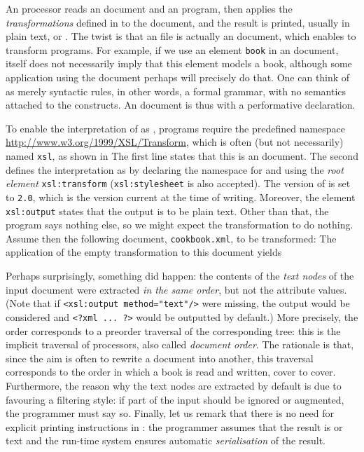 An \XSLT processor reads an \XML document and an \XSLT program, then
applies the \emph{transformations} defined in \XSLT to the document,
and the result is printed, usually in plain text, \XML or \HTML. The
twist is that an \XSLT file is actually an \XML document, which
enables \XSLT to transform \XSLT programs. For example, if we use an
element \verb|book| in an \XML document, \XML itself does not
necessarily imply that this element models a book, although some
application using the document perhaps will precisely do that. One can
think of \XML as merely syntactic rules, in other words, a formal
grammar, with no semantics attached to the constructs. An \XSLT
document is thus \XML with a performative declaration.

To enable the interpretation of \XML as \XSLT, \XSLT programs require
the predefined namespace \url{http://www.w3.org/1999/XSL/Transform},
which is often (but not necessarily) named \texttt{xsl}, as shown in
 The first line states that this is an \XML
document. The second defines the interpretation as \XSLT by declaring
the namespace for \XSLT and using the \emph{root element}
\texttt{xsl:transform} (\texttt{xsl:stylesheet} is also accepted). The
version of \XSLT is set to \texttt{2.0}, which is the version current
at the time of writing. Moreover, the element \texttt{xsl:output}
states that the output is to be plain text. Other than that, the
program says nothing else, so we might expect the transformation to do
nothing. Assume then the following \XML document,
\texttt{cookbook.xml}, to be transformed:
\noindent The application of the empty transformation to this document
yields 

Perhaps surprisingly, something did happen: the contents of the
\emph{text nodes} of the input \XML document were extracted \emph{in
  the same order}, but not the attribute values. (Note that if
\verb|<xsl:output method="text"/>| were missing, the output would be
considered \XML and \verb|<?xml ... ?>| would be outputted by
default.) More precisely, the order corresponds to a preorder
traversal of the corresponding \XML tree: this is the implicit
traversal of \XSLT processors, also called \emph{document order}. The
rationale is that, since the aim is often to rewrite a document into
another, this traversal corresponds to the order in which a book is
read and written, cover to cover. Furthermore, the reason why the text
nodes are extracted by default is due to \XSLT favouring a filtering
style: if part of the input should be ignored or augmented, the
programmer must say so. Finally, let us remark that there is no need
for explicit printing instructions in \XSLT: the programmer assumes
that the result is \XML or text and the run\hyp{}time system ensures
automatic \emph{serialisation} of the result.

